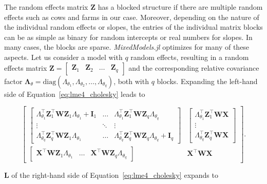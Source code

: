 The random effects matrix $\mathbf{Z}$ has a blocked structure if there are multiple random effects such as cows and farms in our case. Moreover, depending on the nature of the individual random effects or slopes, the entries of the individual matrix blocks can be as simple as binary for random intercepts or real numbers for slopes. In many cases, the blocks are sparse. \textit{MixedModels.jl} optimizes for many of these aspects. Let us consider a model with $q$ random effects, resulting in a random effects matrix $\mathbf{Z}=\begin{bmatrix} \mathbf{Z}_1 & \mathbf{Z}_2 & \dots & \mathbf{Z}_q \end{bmatrix}$ and the corresponding relative covariance factor $\mathbf{\Lambda}_{\theta} = \text{diag}\left( \Lambda_{\theta_1}, \Lambda_{\theta_2}, \dots, \Lambda_{\theta_q} \right)$, both with $q$ blocks. Expanding the left-hand side of Equation~\ref{eq:lme4_cholesky} leads to

\begin{equation}\label{eq:lme4_cholesky_blocked}
\left[
\begin{array}{cc}
\begin{bmatrix}
\Lambda_{\theta_1}^\top \mathbf{Z}_1^\top \mathbf{W} \mathbf{Z}_1 \Lambda_{\theta_1} + \mathbf{I}_1 & \dots & \Lambda_{\theta_1}^\top \mathbf{Z}_1^\top \mathbf{W} \mathbf{Z}_q \Lambda_{\theta_q} \\
\vdots & \ddots & \vdots \\
\Lambda_{\theta_q}^\top \mathbf{Z}_q^\top \mathbf{W} \mathbf{Z}_1 \Lambda_{\theta_1} & \dots & \Lambda_{\theta_q}^\top \mathbf{Z}_q^\top \mathbf{W} \mathbf{Z}_q \Lambda_{\theta_q} + \mathbf{I}_q
\end{bmatrix} 
&
\begin{bmatrix}
\Lambda_{\theta_1}^\top \mathbf{Z}_1^\top \mathbf{W} \mathbf{X} \\
\vdots \\
\Lambda_{\theta_q}^\top \mathbf{Z}_q^\top \mathbf{W} \mathbf{X}
\end{bmatrix}
\\
\begin{bmatrix}
\mathbf{X}^\top \mathbf{W} \mathbf{Z}_1 \Lambda_{\theta_1} & \dots & \mathbf{X}^\top \mathbf{W} \mathbf{Z}_q \Lambda_{\theta_q}
\end{bmatrix}
&
\mathbf{X}^\top \mathbf{W} \mathbf{X}
\end{array}
\right].
\end{equation}

$\mathbf{L}$ of the right-hand side of Equation~\ref{eq:lme4_cholesky} expands to 

